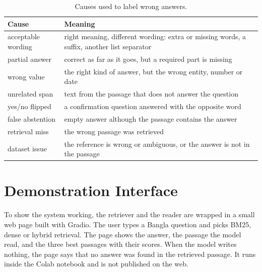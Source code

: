 \begin{table}[H]
	\centering
	\caption{Causes used to label wrong answers.}
	\label{tab:causes}
	\small
	\begin{tabular}{lp{10.5cm}}
		\toprule
		Cause & Meaning \\
		\midrule
		acceptable wording & right meaning, different wording: extra or missing words, a suffix, another list separator \\
		partial answer & correct as far as it goes, but a required part is missing \\
		wrong value & the right kind of answer, but the wrong entity, number or date \\
		unrelated span & text from the passage that does not answer the question \\
		yes/no flipped & a confirmation question answered with the opposite word \\
		false abstention & empty answer although the passage contains the answer \\
		retrieval miss & the wrong passage was retrieved \\
		dataset issue & the reference is wrong or ambiguous, or the answer is not in the passage \\
		\bottomrule
	\end{tabular}
\end{table}

\section{Demonstration Interface}

To show the system working, the retriever and the reader are wrapped in a small web page built with Gradio. The user types a Bangla question and picks BM25, dense or hybrid retrieval. The page shows the answer, the passage the model read, and the three best passages with their scores. When the model writes nothing, the page says that no answer was found in the retrieved passage. It runs inside the Colab notebook and is not published on the web.

